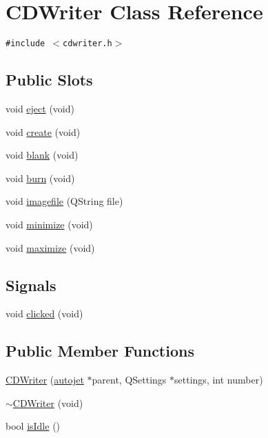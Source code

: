 \hypertarget{class_c_d_writer}{
\section{CDWriter Class Reference}
\label{class_c_d_writer}
}
{\tt \#include $<$cdwriter.h$>$}

\subsection*{Public Slots}
\begin{CompactItemize}
\item 
void \hyperlink{class_c_d_writer_383389be2723db312550f11951efd1a3}{eject} (void)
\item 
void \hyperlink{class_c_d_writer_a5dd84acfc0eb5f4a8dc8cb88b305996}{create} (void)
\item 
void \hyperlink{class_c_d_writer_74d2e90422414e44485b258b5be222d8}{blank} (void)
\item 
void \hyperlink{class_c_d_writer_844d256e7cccd1de34db4e5fa3690dc6}{burn} (void)
\item 
void \hyperlink{class_c_d_writer_f7035db82b553bab5942c320a348728e}{imagefile} (QString file)
\item 
void \hyperlink{class_c_d_writer_a3db5f6361622dd83a529340df737c11}{minimize} (void)
\item 
void \hyperlink{class_c_d_writer_2ea8afb43e2cdcd07b0d783dcf5ac989}{maximize} (void)
\end{CompactItemize}
\subsection*{Signals}
\begin{CompactItemize}
\item 
void \hyperlink{class_c_d_writer_0191ce407c2ebb99f3140bb44b9a9170}{clicked} (void)
\end{CompactItemize}
\subsection*{Public Member Functions}
\begin{CompactItemize}
\item 
\hyperlink{class_c_d_writer_44fe78fc3cfdb9c9cc0a427686141ade}{CDWriter} (\hyperlink{classautojet}{autojet} $\ast$parent, QSettings $\ast$settings, int number)
\item 
\hyperlink{class_c_d_writer_072733059c989992f725774bee5331b7}{$\sim$CDWriter} (void)
\item 
bool \hyperlink{class_c_d_writer_ad6c510839af2c175cfabeaa3067431b}{isIdle} ()
\end{CompactItemize}

